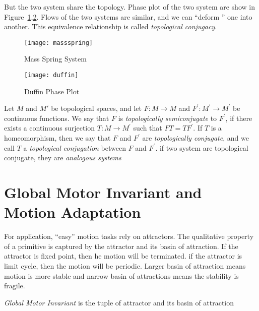 But the two system share the topology. 
Phase plot of the two system are show in Figure~\ref{fig:msphaseplot},\ref{fig:duffin}.
Flows of the two systems are similar, and we can ``deform '' one into another.
This equivalence relationship is called \emph{topological conjugacy}.

\begin{figure}
\begin{center}
\texttt{[image: massspring]}
\end{center}
\caption{Mass Spring System}
\label{fig:msphaseplot}
\end{figure}

\begin{figure}
\begin{center}
\texttt{[image: duffin]}
\end{center}
\caption{Duffin Phase Plot}
\label{fig:duffin}
\end{figure}



\begin{mydef}
Let $M$ and $M'$ be topological spaces, and let $F\colon M\to M$ and $F^{'}\colon M^{'}\to M^{'}$
be continuous functions. We say that $F$ is
\emph{topologically semiconjugate} to $F^{'}$, if there exists a continuous
surjection $T\colon M\to M^{'}$ such that $FT=TF^{'}$. If $T$ is a homeomorphism,
then we say that $F$ and $F^{'}$ are \emph{topologically conjugate}, and we call
$T$ a \emph{topological conjugation} between $F$ and $F^{'}$.
if two system are topological conjugate, they are \emph{analogous systems}
\end{mydef}




\section{Global Motor Invariant and Motion Adaptation}

For \cms application, ``easy'' motion tasks rely on attractors.
The qualitative property of a primitive is captured by the attractor and its basin of attraction.
If the attractor is fixed point, then he motion will be terminated.
if the attractor is limit cycle, then the motion will be periodic.
Larger basin of attraction means motion is more stable and narrow basin of attractions means the stability is fragile.

\begin{mydef}
\emph{Global Motor Invariant} is the tuple of attractor and its basin of attraction
\end{mydef}


